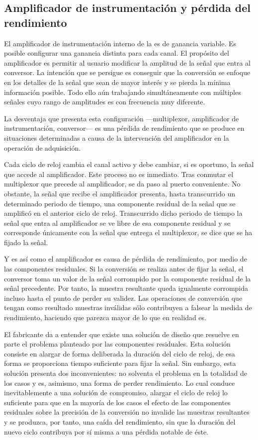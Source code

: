\subsection[El amplificador de instrumentación] {Amplificador de
instrumentación y pérdida del rendimiento}

El amplificador de instrumentación interno de la \kpci{} es de ganancia
variable. Es posible configurar una ganancia distinta para cada canal. El
propósito del amplificador es permitir al usuario modificar la amplitud de
la señal que entra al conversor. La intención que se persigue es conseguir
que la conversión se enfoque en los detalles de la señal que sean de mayor
interés y se pierda la mínima información posible. Todo ello aún trabajando
simultáneamente con múltiples señales cuyo rango de amplitudes es con
frecuencia muy diferente.

La desventaja que presenta esta configuración ---multiplexor, amplificador
de instrumentación, conversor--- es una pérdida de rendimiento que se
produce en situaciones determinadas a causa de la intervención del
amplificador en la operación de adquisición.

Cada ciclo de reloj cambia el canal activo y debe cambiar, si es oportuno,
la señal que accede al amplificador. Este proceso no es inmediato. Tras
conmutar el multiplexor que precede al amplificador, se da paso al puerto
conveniente. No obstante, la señal que recibe el amplificador presenta,
hasta transcurrido un determinado periodo de tiempo, una componente
residual de la señal que se amplificó en el anterior ciclo de reloj.
Transcurrido dicho periodo de tiempo la señal que entra al amplificador se
ve libre de esa componente residual y se corresponde únicamente con la
señal que entrega el multiplexor, se dice que se ha fijado la señal.

Y es así como el amplificador es causa de pérdida de rendimiento, por medio
de las componentes residuales. Si la conversión se realiza antes de fijar
la señal, el conversor toma un valor de la señal corrompido por la
componente residual de la señal precedente. Por tanto, la muestra
resultante queda igualmente corrompida incluso hasta el punto de perder su
validez. Las operaciones de conversión que tengan como resultado muestras
inválidas sólo contribuyen a falsear la medida de rendimiento, haciendo que
parezca mayor de lo que en realidad es.

El fabricante da a entender que existe una solución de diseño que resuelve
en parte el problema planteado por las componentes residuales. Esta
solución consiste en alargar de forma deliberada la duración del ciclo de
reloj, de esa forma se proporciona tiempo suficiente para fijar la señal.
Sin embargo, esta solución presenta dos inconvenientes: no solventa el
problema en la totalidad de los casos y es, asimismo, una forma de perder
rendimiento. Lo cual conduce inevitablemente a una solución de compromiso,
alargar el ciclo de reloj lo suficiente para que en la mayoría de los casos
el efecto de las componentes residuales sobre la precisión de la conversión
no invalide las muestras resultantes y se produzca, por tanto, una caída
del rendimiento, sin que la duración del nuevo ciclo contribuya por sí
misma a una pérdida notable de éste.


